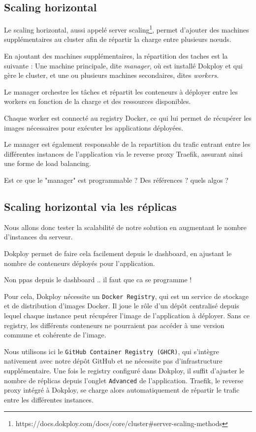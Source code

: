 \documentclass{rapportClass} %
\begin{document}
\subsection{Scaling horizontal}
Le scaling horizontal, aussi appelé server scaling\footnote{https://docs.dokploy.com/docs/core/cluster\#server-scaling-methods},
permet d'ajouter des machines supplémentaires au cluster afin de répartir la charge entre plusieurs nœuds.

En ajoutant des machines supplémentaires, la répartition des taches est la suivante :
Une machine principale, dite \textit{manager}, où est installé Dokploy et qui gère le cluster, et une ou plusieurs 
machines secondaires, dites \textit{workers}.

Le manager orchestre les tâches et répartit les conteneurs à déployer
entre les workers en fonction de la charge et des ressources
disponibles.

Chaque worker est connecté au registry Docker, ce qui lui permet de
récupérer les images nécessaires pour exécuter les applications
déployées.

Le manager est également responsable de la repartition du trafic
entrant entre les différentes instances de l'application via le
reverse proxy Traefik, assurant ainsi une forme de load balancing.

{\color{red} Est ce que le "manager" est programmable ?}
{\color{red} Des références ? quels algos ?}

\subsection{Scaling horizontal via les réplicas}
Nous allons donc tester la scalabilité de notre solution en augmentant le nombre d'instances du serveur. 

\smallskip
Dokploy permet de faire cela facilement depuis le dashboard, en ajustant le nombre de conteneurs déployés pour 
l'application.

{\color{red} Non ppas depuis le dashboard .. il faut que ca se programme !}

\smallskip
Pour cela, Dokploy nécessite un \texttt{Docker Registry}, qui est un service de stockage et de distribution d'images Docker. 
Il joue le rôle d'un dépôt centralisé depuis lequel chaque instance peut récupérer l'image de l'application à déployer. 
Sans ce registry, les différents conteneurs ne pourraient pas accéder à une version commune et cohérente de l'image.

\smallskip
Nous utilisons ici le \texttt{GitHub Container Registry (GHCR)}, qui s'intègre nativement avec notre dépôt GitHub et 
ne nécessite pas d'infrastructure supplémentaire. Une fois le registry configuré dans Dokploy, il suffit d'ajuster 
le nombre de réplicas depuis l'onglet \texttt{Advanced} de l'application. Traefik, le reverse proxy intégré à Dokploy, 
se charge alors automatiquement de répartir le trafic entre les différentes instances.
\end{document}
